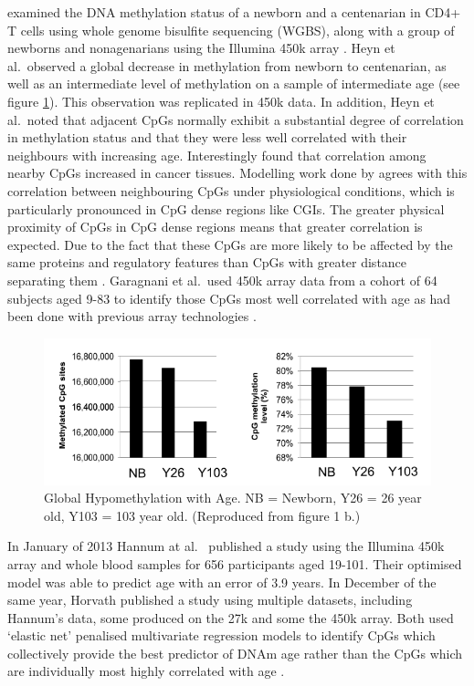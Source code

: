 \documentclass[]{book}
\begin{document}
\citet{Heyn2012} examined the DNA methylation status of a newborn and a centenarian in CD4+ T cells using whole genome bisulfite sequencing (WGBS), along with a group of newborns and nonagenarians using the Illumina 450k array \citep{Bibikova2011}. Heyn et al.~observed a global decrease in methylation from newborn to centenarian, as well as an intermediate level of methylation on a sample of intermediate age (see figure \ref{fig:Heyn2012F1b}). This observation was replicated in 450k data. In addition, Heyn et al.~noted that adjacent CpGs normally exhibit a substantial degree of correlation in methylation status and that they were less well correlated with their neighbours with increasing age. Interestingly \citet{Jenkinson2017} found that correlation among nearby CpGs increased in cancer tissues. Modelling work done by \citet{Affinito2016} agrees with this correlation between neighbouring CpGs under physiological conditions, which is particularly pronounced in CpG dense regions like CGIs. The greater physical proximity of CpGs in CpG dense regions means that greater correlation is expected. Due to the fact that these CpGs are more likely to be affected by the same proteins and regulatory features than CpGs with greater distance separating them \citep{Haerter2014}. Garagnani et al.~used 450k array data from a cohort of 64 subjects aged 9-83 to identify those CpGs most well correlated with age as had been done with previous array technologies \citep{Garagnani2012}.

\begin{figure}
\includegraphics[width=8.75in]{figs/Heyn2012F1b} \caption{Global Hypomethylation with Age. NB = Newborn, Y26 = 26 year old, Y103 = 103 year old.
(Reproduced from \citet{Heyn2012} figure 1 b.)}\label{fig:Heyn2012F1b}
\end{figure}




In January of 2013 Hannum at al.~\citep{Hannum2013} published a study using the Illumina 450k array and whole blood samples for 656 participants aged 19-101. Their optimised model was able to predict age with an error of 3.9 years. In December of the same year, Horvath \citep{Horvath2013} published a study using multiple datasets, including Hannum's data, some produced on the 27k and some the 450k array. Both used `elastic net' penalised multivariate regression models to identify CpGs which collectively provide the best predictor of DNAm age rather than the CpGs which are individually most highly correlated with age \citep{Friedman2010}.
\end{document}
